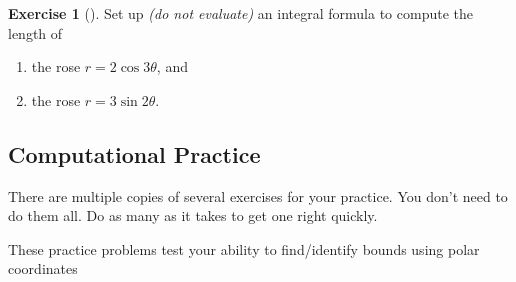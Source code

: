 \documentclass[10pt,]{book}
\theoremstyle{plain}
\theoremstyle{definition}
\theoremstyle{definition}
\theoremstyle{definition}
\theoremstyle{definition}
\newtheorem{exploration}[project]{Exercise}
\theoremstyle{definition}
\numberwithin{equation}{section}
\begin{document}
\begin{exploration}[]\label{exploration-97}
Set up \emph{(do not evaluate)} an integral formula to compute the length of%
\begin{enumerate}[font=\bfseries,label=(\alph*),ref=\alph*]
\item\label{task-160} the rose \(r=2\cos 3\theta\), and%
\item\label{task-161} the rose \(r=3\sin 2\theta\).%
\end{enumerate}
\end{exploration}
\typeout{************************************************}
\typeout{************************************************}
\subsection[{Computational Practice}]{Computational Practice}\label{exercises-7}
There are multiple copies of several exercises for your practice. You don't need to do them all. Do as many as it takes to get one right quickly.%
\hypertarget{exercisegroup-4}{}\par\noindent These practice problems test your ability to find/identify bounds using polar coordinates%
\end{document}

